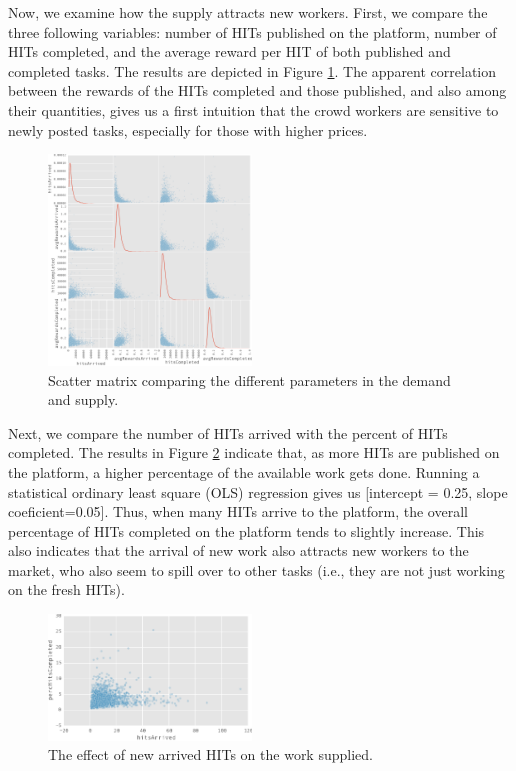 Now, we examine how the supply attracts new workers. First, we compare the three following variables: number of HITs published on the platform, number of HITs completed, and the average reward per HIT of both published and completed tasks. The results are depicted in Figure \ref{fig:scatter_matrix}. The apparent correlation between the rewards of the HITs completed and those published, and also among their quantities, gives us a first intuition that the crowd workers are sensitive to newly posted tasks, especially for those with higher prices.

\begin{figure}[tb]
	\centering
		\includegraphics[width=0.48\textwidth]{figures/scatter}
	\caption{Scatter matrix comparing the different parameters in the demand and supply.}
	\label{fig:scatter_matrix}
\end{figure}

Next, we compare the number of HITs arrived with the percent of HITs completed.
The results in Figure \ref{fig:perc_hits_completed} indicate that, as more HITs are published on the platform, a higher percentage of the available work gets done. 
Running a statistical ordinary least square (OLS) regression gives us [intercept = 0.25, slope coeficient=0.05]. Thus, when many HITs arrive to the platform, the overall percentage of HITs completed on the platform tends to slightly increase.
This also indicates that the arrival of new work also attracts new workers to the market, who also seem to spill over to other tasks (i.e., they are not just working on the fresh HITs). 
\begin{figure}[tb]
	\centering
		\includegraphics[width=0.48\textwidth]{figures/percHitsCompleted.pdf}
	\caption{The effect of new arrived HITs on the work  supplied.}
	\label{fig:perc_hits_completed}
\end{figure}

